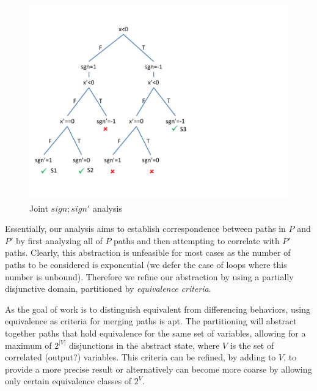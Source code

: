 \begin{figure}
\centering
\includegraphics[scale=0.4,clip=true,trim = 0pt 73pt 250pt 20pt]{figures/sign-graph-joint}
\caption{Joint $sign;sign'$ analysis}
\end{figure}

Essentially, our analysis aims to establish correspondence between paths in $P$ and $P'$ by first analyzing all of $P$ paths and then attempting to correlate with $P'$ paths. Clearly, this abstraction is unfeasible for most cases as the number of paths to be considered is exponential (we defer the case of loops where this number is unbound). Therefore we refine our abstraction by using a partially disjunctive domain, partitioned by \emph{equivalence criteria}.


As the goal of work is to distinguish equivalent from differencing behaviors, using equivalence as criteria for merging paths is apt. The partitioning will abstract together paths that hold equivalence for the same set of variables, allowing for a maximum of $2^{|V|}$ disjunctions in the abstract state, where $V$ is the set of correlated (output?) variables. This criteria can be refined, by adding to $V$, to provide a more precise result or alternatively can become more coarse by allowing only certain equivalence classes of $2^{V}$.

